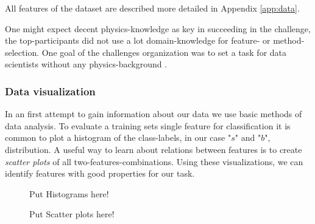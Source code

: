 All features of the dataset are described more detailed in Appendix \ref{app:data}.

One might expect decent physics-knowledge as key in succeeding in the challenge, the top-participants did not use a lot domain-knowledge for feature- or method-selection. One goal of the challenges organization was to set a task for data scientists without any physics-background \cite{higgsPaper}.

\subsubsection{Data visualization}

In an first attempt to gain information about our data we use basic methods of data analysis.
To evaluate a training sets single feature for classification it is common to plot a histogram of the class-labels, in our case "$s$" and "$b$", distribution. A useful way to learn about relations between features is to create \textit{scatter plots} of all two-features-combinations.
Using these visualizations, we can identify features with good properties for our task.

\begin{figure}[h]
	\caption{Put Histograms here!}
\end{figure}

\begin{figure}[h]
	\caption{Put Scatter plots here!}
\end{figure}

